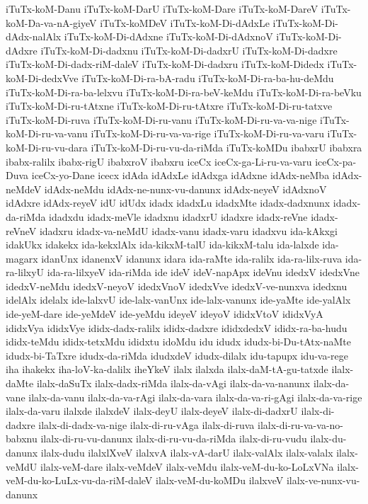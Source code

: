 {iTuTx-koM-Danu
iTuTx-koM-DarU
iTuTx-koM-Dare
iTuTx-koM-DareV
iTuTx-koM-Da-va-nA-giyeV
iTuTx-koMDeV
iTuTx-koM-Di-dAdxLe
iTuTx-koM-Di-dAdx-nalAlx
iTuTx-koM-Di-dAdxne
iTuTx-koM-Di-dAdxnoV
iTuTx-koM-Di-dAdxre
iTuTx-koM-Di-dadxnu
iTuTx-koM-Di-dadxrU
iTuTx-koM-Di-dadxre
iTuTx-koM-Di-dadx-riM-daleV
iTuTx-koM-Di-dadxru
iTuTx-koM-Didedx
iTuTx-koM-Di-dedxVve
iTuTx-koM-Di-ra-bA-radu
iTuTx-koM-Di-ra-ba-hu-deMdu
iTuTx-koM-Di-ra-ba-lelxvu
iTuTx-koM-Di-ra-beV-keMdu
iTuTx-koM-Di-ra-beVku
iTuTx-koM-Di-ru-tAtxne
iTuTx-koM-Di-ru-tAtxre
iTuTx-koM-Di-ru-tatxve
iTuTx-koM-Di-ruva
iTuTx-koM-Di-ru-vanu
iTuTx-koM-Di-ru-va-va-nige
iTuTx-koM-Di-ru-va-vanu
iTuTx-koM-Di-ru-va-va-rige
iTuTx-koM-Di-ru-va-varu
iTuTx-koM-Di-ru-vu-dara
iTuTx-koM-Di-ru-vu-da-riMda
iTuTx-koMDu
ibabxrU
ibabxra
ibabx-ralilx
ibabx-rigU
ibabxroV
ibabxru
iceCx
iceCx-ga-Li-ru-va-varu
iceCx-pa-Duva
iceCx-yo-Dane
icecx
idAda
idAdxLe
idAdxga
idAdxne
idAdx-neMba
idAdx-neMdeV
idAdx-neMdu
idAdx-ne-nunx-vu-danunx
idAdx-neyeV
idAdxnoV
idAdxre
idAdx-reyeV
idU
idUdx
idadx
idadxLu
idadxMte
idadx-dadxnunx
idadx-da-riMda
idadxdu
idadx-meVle
idadxnu
idadxrU
idadxre
idadx-reVne
idadx-reVneV
idadxru
idadx-va-neMdU
idadx-vanu
idadx-varu
idadxvu
ida-kAkxgi
idakUkx
idakekx
ida-kekxlAlx
ida-kikxM-talU
ida-kikxM-talu
ida-lalxde
ida-magarx
idanUnx
idanenxV
idanunx
idara
ida-raMte
ida-ralilx
ida-ra-lilx-ruva
ida-ra-lilxyU
ida-ra-lilxyeV
ida-riMda
ide
ideV
ideV-napApx
ideVnu
idedxV
idedxVne
idedxV-neMdu
idedxV-neyoV
idedxVnoV
idedxVve
idedxV-ve-nunxva
idedxnu
idelAlx
idelalx
ide-lalxvU
ide-lalx-vanUnx
ide-lalx-vanunx
ide-yaMte
ide-yalAlx
ide-yeM-dare
ide-yeMdeV
ide-yeMdu
ideyeV
ideyoV
ididxVtoV
ididxVyA
ididxVya
ididxVye
ididx-dadx-ralilx
ididx-dadxre
ididxdedxV
ididx-ra-ba-hudu
ididx-teMdu
ididx-tetxMdu
ididxtu
idoMdu
idu
idudx
idudx-bi-Du-tAtx-naMte
idudx-bi-TaTxre
idudx-da-riMda
idudxdeV
idudx-dilalx
idu-tapupx
idu-va-rege
iha
ihakekx
iha-loV-ka-dalilx
iheYkeV
ilalx
ilalxda
ilalx-daM-tA-gu-tatxde
ilalx-daMte
ilalx-daSuTx
ilalx-dadx-riMda
ilalx-da-vAgi
ilalx-da-va-nanunx
ilalx-da-vane
ilalx-da-vanu
ilalx-da-va-rAgi
ilalx-da-vara
ilalx-da-va-ri-gAgi
ilalx-da-va-rige
ilalx-da-varu
ilalxde
ilalxdeV
ilalx-deyU
ilalx-deyeV
ilalx-di-dadxrU
ilalx-di-dadxre
ilalx-di-dadx-va-nige
ilalx-di-ru-vAga
ilalx-di-ruva
ilalx-di-ru-va-va-no-babxnu
ilalx-di-ru-vu-danunx
ilalx-di-ru-vu-da-riMda
ilalx-di-ru-vudu
ilalx-du-danunx
ilalx-dudu
ilalxlXveV
ilalxvA
ilalx-vA-darU
ilalx-valAlx
ilalx-valalx
ilalx-veMdU
ilalx-veM-dare
ilalx-veMdeV
ilalx-veMdu
ilalx-veM-du-ko-LoLxVNa
ilalx-veM-du-ko-LuLx-vu-da-riM-daleV
ilalx-veM-du-koMDu
ilalxveV
ilalx-ve-nunx-vu-danunx
}

